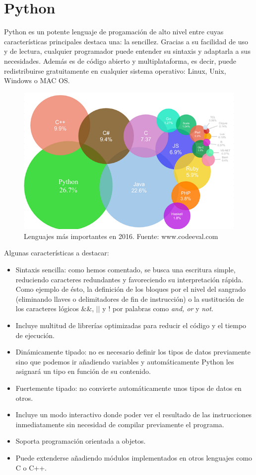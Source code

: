 \documentclass[a4paper, 12pt]{book}
\begin{document}
\section{Python} 
\label{sec:seccion2}
Python es un potente lenguaje de progamación de alto nivel entre cuyas características principales destaca una: la sencillez. Gracias a su facilidad de uso y de lectura, cualquier programador puede entender su sintaxis y adaptarla a sus necesidades. Además es de código abierto y multiplataforma, es decir, puede redistribuirse gratuitamente en cualquier sistema operativo: Linux, Unix, Windows o MAC OS.
\begin{figure}[H]
  \centering
  \includegraphics[width=0.70\linewidth, keepaspectratio]{img/codeval2016}
  \caption{Lenguajes más importantes en 2016. Fuente: www.codeeval.com}
  \label{fig:codeval2016}
\end{figure}
Algunas características a destacar:
\begin{itemize}
	\item Sintaxis sencilla: como hemos comentado, se busca una escritura simple, reduciendo caracteres redundantes y favoreciendo su interpretación rápida. Como ejemplo de ésto, la definición de los bloques por el nivel del sangrado (eliminando llaves o delimitadores de fin de instrucción) o la sustitución de los caracteres lógicos \&\&, \(\vert \vert\) y ! por palabras como \textit{and, or} y \textit{not}.   	
	\item Incluye multitud de librerías optimizadas para reducir el código y el tiempo de ejecución.
	\item Dinámicamente tipado: no es necesario definir los tipos de datos previamente sino que podemos ir añadiendo variables y automáticamente Python les asignará un tipo en función de su contenido. 
	\item Fuertemente tipado: no convierte automáticamente unos tipos de datos en otros.
	\item Incluye un modo interactivo donde poder ver el resultado de las instrucciones inmediatamente sin necesidad de compilar previamente el programa.
	\item Soporta programación orientada a objetos.
	\item Puede extenderse añadiendo módulos implementados en otros lenguajes como C o C++. 
\end{itemize}
\end{document}
